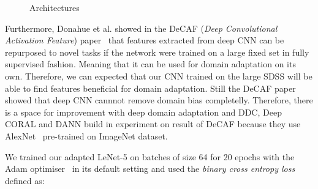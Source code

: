 \begin{figure}
\begin{center}
{
			\label{drcn_architecture}
		}
	\end{center}
	\caption{Architectures}
\end{figure}

Furthermore, Donahue et al. showed in the DeCAF (\textit{Deep Convolutional Activation Feature}) paper~\cite{donahue2014}
that features extracted from deep CNN can be repurposed to novel tasks
if the network were trained on a large fixed set in fully supervised fashion.
Meaning that it can be used for domain adaptation on its own.
Therefore, we can expected that our CNN trained on the large SDSS
will be able to find features beneficial for domain adaptation.
Still the DeCAF paper showed that
deep CNN cannnot remove domain bias completelly.
Therefore, there is a space for improvement with deep domain adaptation
and DDC, Deep CORAL and DANN build in experiment on result of DeCAF
because they use AlexNet~\cite{krizhevsky2012} pre-trained on ImageNet dataset.

We trained our adapted LeNet-5 on batches of size 64 for 20 epochs
with the Adam optimiser~\cite{kingma2014} in its default setting
and used the \textit{binary cross entropy loss} defined as:

